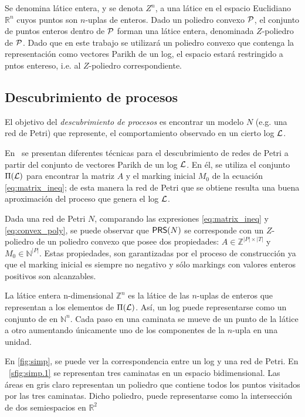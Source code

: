 Se denomina látice entera, y se denota $Z^n$, a una látice en el espacio Euclidiano $\mathbb{R}^n$
cuyos puntos son $n$-uplas de enteros. 
Dado un poliedro convexo ${\mathcal P}$, el conjunto de puntos enteros dentro de ${\mathcal P}$
forman una látice entera, denominada $Z$-poliedro de ${\mathcal P}$.
Dado que en este trabajo se utilizará un poliedro convexo que contenga la representación como vectores Parikh
de un log, el espacio estará restringido a pntos entereso, i.e. al $Z$-poliedro correspondiente.

\subsection{Descubrimiento de procesos} 
\label{sec:2.discovery discovery}

El objetivo del \textit{descubrimiento de procesos} es encontrar un 
modelo $N$ (e.g. una red de Petri) que represente, el comportamiento 
observado en un cierto log ${\mathcal L}$.

En~\cite{CarmonaC14} se presentan diferentes técnicas 
para el descubrimiento de redes de Petri a partir del 
conjunto de vectores Parikh de un log ${\mathcal L}$.
En él, se utiliza el conjunto $\Pi({\mathcal L})$ para encontrar
la matriz $A$ y el marking inicial $M_0$ de la ecuación \eqref{eq:matrix_ineq};
de esta manera la red de Petri que se obtiene resulta 
una buena aproximación del proceso que genera el log ${\mathcal L}$.

Dada una red de Petri $N$, comparando las expresiones \eqref{eq:matrix_ineq}
y \eqref{eq:convex_poly}, se puede observar que $\textsf{PRS}(N)$ se corresponde con
un $Z$-poliedro de un poliedro convexo que posee dos propiedades:
\mbox{$A \in \mathbb{Z}^{|P|\times|T|}$} y \mbox{$M_0 \in \mathbb{N}^{|P|}$}.
Estas propiedades, son garantizadas por el proceso de construcción ya que el
marking inicial es siempre no negativo y sólo markings con valores enteros positivos
son alcanzables.


La látice entera n-dimensional $\mathbb{Z}^n$ es la látice de las $n$-uplas
de enteros que representan a los elementos de $\Pi({\mathcal L})$. Así, un log 
puede representarse como un conjunto de  en $\mathbb{N}^n$. Cada paso 
en una caminata se mueve de un punto de la látice a otro aumentando únicamente uno de
los componentes de la $n$-upla en una unidad.

En \autoref{fig:simp}, se puede ver la correspondencia entre un log y una red
de Petri.  En ~\autoref{sfig:simp.1} se representan tres caminatas en un espacio
bidimensional. Las áreas en gris claro representan un poliedro que contiene todos 
los puntos visitados por las tres caminatas. Dicho poliedro, puede representarse como 
la intersección de dos semiespacios en $\mathbb{R}^2$

